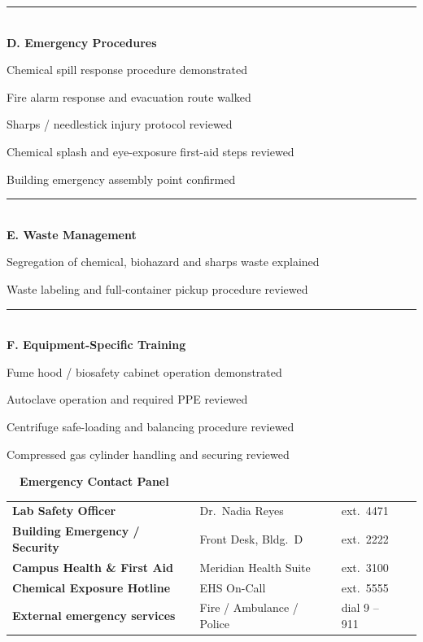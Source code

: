 \documentclass[10pt,a4paper]{article}
\newcommand{\subsecbar}[2]{%
  \vspace{2pt}
  {\color{labNavy}\rule{\linewidth}{0.55pt}}\\[1.5pt]
  {\small\bfseries\color{clinicalTeal} #1 \normalfont\color{slateGray}\footnotesize\; #2}\\[1pt]
}
\begin{document}
\begin{minipage}[t]{0.485\linewidth}
\subsecbar{D. Emergency Procedures}{}
\begin{checklist}
\item Chemical spill response procedure demonstrated
\item Fire alarm response and evacuation route walked
\item Sharps / needlestick injury protocol reviewed
\item Chemical splash and eye-exposure first-aid steps reviewed
\item Building emergency assembly point confirmed
\end{checklist}

\subsecbar{E. Waste Management}{}
\begin{checklist}
\item Segregation of chemical, biohazard and sharps waste explained
\item Waste labeling and full-container pickup procedure reviewed
\end{checklist}

\subsecbar{F. Equipment-Specific Training}{}
\begin{checklist}
\item Fume hood / biosafety cabinet operation demonstrated
\item Autoclave operation and required PPE reviewed
\item Centrifuge safe-loading and balancing procedure reviewed
\item Compressed gas cylinder handling and securing reviewed
\end{checklist}
\end{minipage}

\vspace{5pt}

\begin{tcolorbox}[
  colback=alertRed!05, colframe=alertRed, boxrule=0.7pt, sharp corners,
  top=4pt, bottom=4pt, left=8pt, right=8pt
]
{\small\bfseries\color{alertRed}\faPhone\ \ Emergency Contact Panel}\\[3pt]
\footnotesize
\begin{tabular}{@{}p{4.6cm}p{3.6cm}p{3.9cm}p{3.2cm}@{}}
\textbf{Lab Safety Officer} & Dr.\ Nadia Reyes & ext.\ 4471 & \\
\textbf{Building Emergency / Security} & Front Desk, Bldg.\ D & ext.\ 2222 & \\
\textbf{Campus Health \& First Aid} & Meridian Health Suite & ext.\ 3100 & \\
\textbf{Chemical Exposure Hotline} & EHS On-Call & ext.\ 5555 & \\
\textbf{External emergency services} & Fire / Ambulance / Police & dial 9 -- 911 &
\end{tabular}
\end{tcolorbox}
\end{document}
